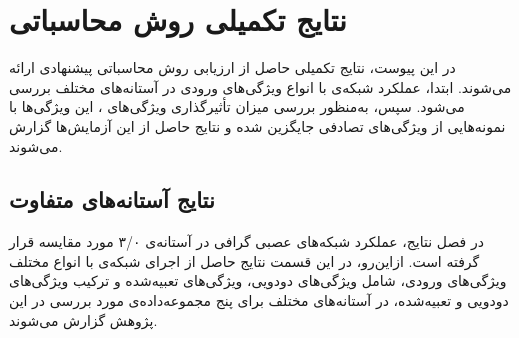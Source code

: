 \chapter{نتایج تکمیلی روش محاسباتی}

در این پیوست، نتایج تکمیلی حاصل از ارزیابی روش محاسباتی پیشنهادی ارائه می‌شوند. ابتدا، عملکرد شبکه‌ی  با انواع ویژگی‌های ورودی در آستانه‌های مختلف بررسی می‌شود. سپس، به‌منظور بررسی میزان تأثیرگذاری ویژگی‌های ، این ویژگی‌ها با نمونه‌هایی از ویژگی‌های تصادفی جایگزین شده و نتایج حاصل از این آزمایش‌ها گزارش می‌شوند.


\section{نتایج آستانه‌های متفاوت}
در فصل نتایج، عملکرد شبکه‌های عصبی گرافی در آستانه‌‌ی ۳/۰ مورد مقایسه قرار گرفته است. ازاین‌رو، در این قسمت نتایج حاصل از اجرای شبکه‌ی  با انواع مختلف ویژگی‌های ورودی، شامل ویژگی‌های دودویی، ویژگی‌های تعبیه‌شده و ترکیب ویژگی‌های دودویی و تعبیه‌شده، در آستانه‌های مختلف برای پنج مجموعه‌داده‌ی مورد بررسی در این پژوهش گزارش می‌شوند.


